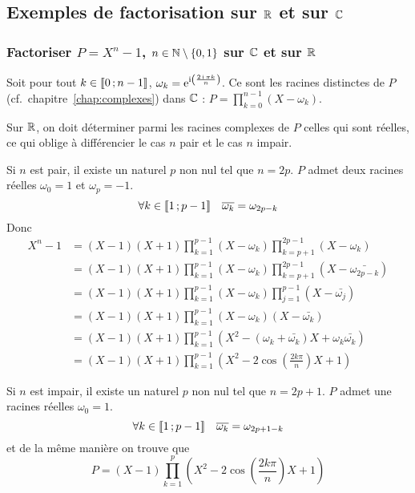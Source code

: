 \subsection{Exemples de factorisation sur \(\mathbb{R}\) et sur \(\mathbb{C}\)}

\subsubsection{Factoriser \(P=X^n-1\), \(n \in \mathbb{N}\setminus\{0,1\}\) sur \(\mathbb{C}\) et sur \(\mathbb{R}\)}

Soit pour tout \(k \in \mathopen{\llbracket}0\mathclose{}\mathpunct{};n-1\mathclose{\rrbracket}\), \(\omega_k = \operatorname{e}^{\operatorname{i}\left(\frac{2\operatorname{i} \pi k}{n}\right)}\). Ce sont les racines distinctes de \(P\) (cf.\ chapitre~\ref{chap:complexes}) dans \(\mathbb{C}\) : \(P = \prod_{k=0}^{n-1}(X-\omega_k)\).

Sur \(\mathbb{R}\), on doit déterminer parmi les racines complexes de \(P\) celles qui sont réelles, ce qui oblige à différencier le cas \(n\) pair et le cas \(n\) impair.

Si \(n\) est pair, il existe un naturel \(p\) non nul tel que \(n=2p\). \(P\) admet deux racines réelles \(\omega_0=1\) et \(\omega_p=-1\).
\begin{equation}
  \forall k \in \mathopen{\llbracket}1\mathclose{}\mathpunct{};p-1\mathclose{\rrbracket} \quad \overline{\omega_k}=\omega_{2p-k}
\end{equation}
Donc
\begin{align}
  X^n-1 &= (X-1)(X+1) \prod_{k=1}^{p-1} (X-\omega_k)\prod_{k=p+1}^{2p-1} (X-\omega_k) \\
  &=(X-1)(X+1) \prod_{k=1}^{p-1} (X-\omega_k) \prod_{k=p+1}^{2p-1} (X-\bar{\omega_{2p-k}})\\
  &=(X-1)(X+1) \prod_{k=1}^{p-1} (X-\omega_k) \prod_{j=1}^{p-1} (X-\bar{\omega_{j}})\\
  &=(X-1)(X+1) \prod_{k=1}^{p-1} (X-\omega_k)(X-\bar{\omega_{k}})\\
  &=(X-1)(X+1) \prod_{k=1}^{p-1} (X^2-(\omega_k+\bar{\omega_k})X+\omega_k\bar{\omega_k})\\
  &=(X-1)(X+1) \prod_{k=1}^{p-1} \left(X^2-2\cos\left(\frac{2k\pi}{n}\right)X+1\right)
\end{align}

Si \(n\) est impair, il existe un naturel \(p\) non nul tel que \(n=2p+1\). \(P\) admet une racines réelles \(\omega_0=1\).
\begin{equation}
  \forall k \in \mathopen{\llbracket}1\mathclose{}\mathpunct{};p-1\mathclose{\rrbracket} \quad \overline{\omega_k}=\omega_{2p+1-k}
\end{equation}
et de la même manière on trouve que
\begin{equation}
  P=(X-1) \prod_{k=1}^{p} \left(X^2-2\cos\left(\frac{2k\pi}{n}\right)X+1\right)
\end{equation}

